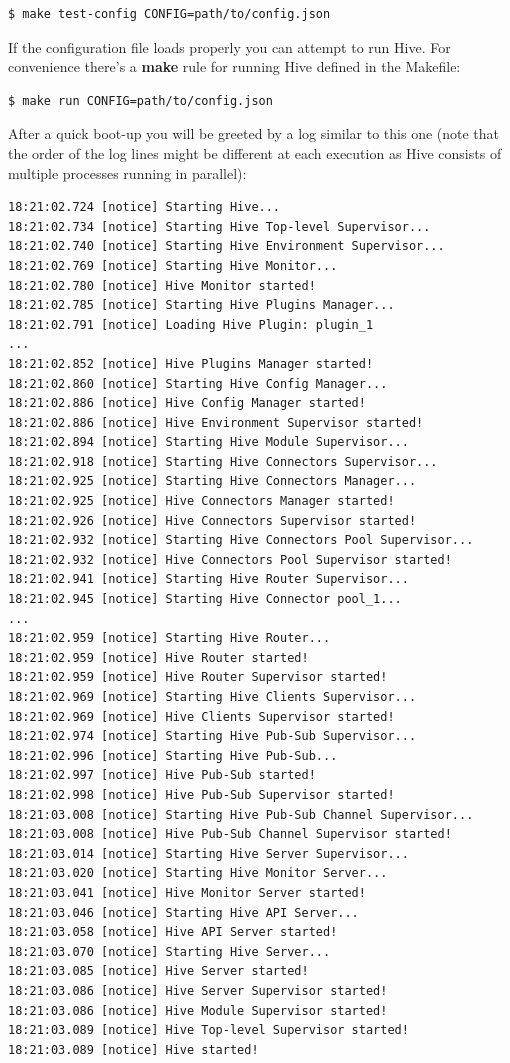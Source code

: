 \documentclass[a4paper]{article}
\begin{document}
\begin{verbatim}
$ make test-config CONFIG=path/to/config.json
\end{verbatim}



\noindent
If the configuration file loads properly you can attempt to run Hive. For convenience there's a \textbf{make} rule for running Hive defined in the Makefile:


\begin{verbatim}
$ make run CONFIG=path/to/config.json
\end{verbatim}



\noindent
After a quick boot-up you will be greeted by a log similar to this one (note that the order of the log lines might be different at each execution as Hive consists of multiple processes running in parallel):


\begin{verbatim}
18:21:02.724 [notice] Starting Hive...
18:21:02.734 [notice] Starting Hive Top-level Supervisor...
18:21:02.740 [notice] Starting Hive Environment Supervisor...
18:21:02.769 [notice] Starting Hive Monitor...
18:21:02.780 [notice] Hive Monitor started!
18:21:02.785 [notice] Starting Hive Plugins Manager...
18:21:02.791 [notice] Loading Hive Plugin: plugin_1
...
18:21:02.852 [notice] Hive Plugins Manager started!
18:21:02.860 [notice] Starting Hive Config Manager...
18:21:02.886 [notice] Hive Config Manager started!
18:21:02.886 [notice] Hive Environment Supervisor started!
18:21:02.894 [notice] Starting Hive Module Supervisor...
18:21:02.918 [notice] Starting Hive Connectors Supervisor...
18:21:02.925 [notice] Starting Hive Connectors Manager...
18:21:02.925 [notice] Hive Connectors Manager started!
18:21:02.926 [notice] Hive Connectors Supervisor started!
18:21:02.932 [notice] Starting Hive Connectors Pool Supervisor...
18:21:02.932 [notice] Hive Connectors Pool Supervisor started!
18:21:02.941 [notice] Starting Hive Router Supervisor...
18:21:02.945 [notice] Starting Hive Connector pool_1...
...
18:21:02.959 [notice] Starting Hive Router...
18:21:02.959 [notice] Hive Router started!
18:21:02.959 [notice] Hive Router Supervisor started!
18:21:02.969 [notice] Starting Hive Clients Supervisor...
18:21:02.969 [notice] Hive Clients Supervisor started!
18:21:02.974 [notice] Starting Hive Pub-Sub Supervisor...
18:21:02.996 [notice] Starting Hive Pub-Sub...
18:21:02.997 [notice] Hive Pub-Sub started!
18:21:02.998 [notice] Hive Pub-Sub Supervisor started!
18:21:03.008 [notice] Starting Hive Pub-Sub Channel Supervisor...
18:21:03.008 [notice] Hive Pub-Sub Channel Supervisor started!
18:21:03.014 [notice] Starting Hive Server Supervisor...
18:21:03.020 [notice] Starting Hive Monitor Server...
18:21:03.041 [notice] Hive Monitor Server started!
18:21:03.046 [notice] Starting Hive API Server...
18:21:03.058 [notice] Hive API Server started!
18:21:03.070 [notice] Starting Hive Server...
18:21:03.085 [notice] Hive Server started!
18:21:03.086 [notice] Hive Server Supervisor started!
18:21:03.086 [notice] Hive Module Supervisor started!
18:21:03.089 [notice] Hive Top-level Supervisor started!
18:21:03.089 [notice] Hive started!
\end{verbatim}
\end{document}
